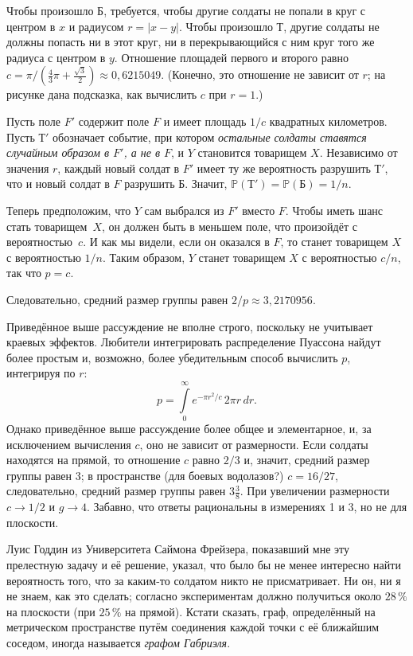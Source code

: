 \documentclass[twoside]{book}
\begin{document}
Чтобы произошло $\text{Б}$, требуется, чтобы другие солдаты не попали в круг с центром в $x$ и радиусом $r=|x-y|$.
Чтобы произошло $\text{Т}$, другие солдаты не должны попасть ни в этот круг, ни в перекрывающийся с ним круг того же радиуса с центром в $y$.
Отношение площадей первого и второго равно $c=\pi/(\tfrac43\pi+\tfrac{\sqrt{3}}{2}) \approx 0{,}6215049$.
(Конечно, это отношение не зависит от $r$; на рисунке дана подсказка, как вычислить $c$ при $r=1$.)

Пусть поле $F'$ содержит поле $F$ и имеет площадь $1/c$ квадратных километров.
Пусть $\text{Т}'$ обозначает событие, при котором \emph{остальные солдаты ставятся случайным образом в $F'$, а не в $F$}, и $Y$ становится товарищем $X$.
Независимо от значения $r$, каждый новый солдат в $F'$ имеет ту же вероятность разрушить $\text{Т}'$, что и новый солдат в $F$ разрушить $\text{Б}$. 
Значит, $\mathbb{P}(\text{Т}')= \mathbb{P}(\text{Б}) = 1/n$.

Теперь предположим, что $Y$ сам выбрался из $F'$ вместо $F$.
Чтобы иметь шанс стать товарищем~$X$, он должен быть в меньшем поле, что произойдёт с вероятностью~$c$.
И как мы видели, если он оказался в $F$, то станет товарищем $X$ с вероятностью $1/n$.
Таким образом, $Y$ станет товарищем $X$ с вероятностью $c/n$, так что $p=c$.

Следовательно, средний размер группы равен $2/p\approx3{,}2170956$.
\heart

Приведённое выше рассуждение не вполне строго, поскольку не учитывает краевых эффектов.
Любители интегрировать распределение Пуассона 
найдут более простым и, возможно, более убедительным способ вычислить $p$, интегрируя по $r$:
\[p=\int\limits_0^\infty e^{-\pi r^2/c}\,2\pi r\, dr.\]
Однако приведённое выше рассуждение более общее и элементарное, и, за исключением вычисления $c$, оно не зависит от размерности.
Если солдаты находятся на прямой, то отношение $c$ равно $2/3$ и, значит, средний размер группы равен 3;
в пространстве (для боевых водолазов?) $c = 16/27$, следовательно, средний размер группы равен $3\tfrac38$.
При увеличении размерности $c\to 1/2$ и $g\to 4$. 
Забавно, что ответы рациональны в измерениях 1 и 3, но не для плоскости.

Луис Годдин из Университета Саймона Фрейзера, показавший мне эту прелестную задачу и её решение, указал, что было бы не менее интересно найти вероятность того, что за каким-то солдатом никто не присматривает.
Ни он, ни я не знаем, как это сделать;
согласно экспериментам должно получиться около $28\,\%$ на плоскости (при $25\,\%$ на прямой).
Кстати сказать, граф, определённый на метрическом пространстве путём соединения каждой точки с её ближайшим соседом, иногда называется \emph{графом Габриэля}.
\end{document}
